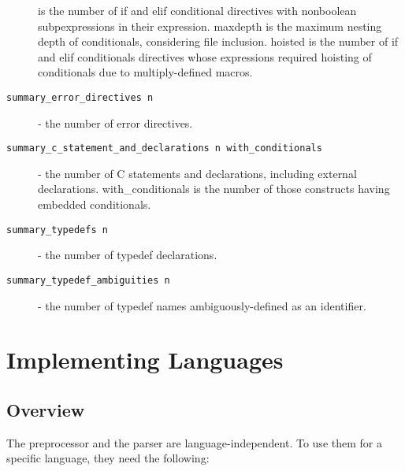 \documentclass{article}
\begin{document}
\begin{description}
  is the number of if and elif conditional directives with nonboolean
  subpexpressions in their expression.  maxdepth is the maximum
  nesting depth of conditionals, considering file inclusion.  hoisted
  is the number of if and elif conditionals directives whose
  expressions required hoisting of conditionals due to
  multiply-defined macros.
\item[\texttt{summary\_error\_directives n}] - the number of error
  directives.
\item[\texttt{summary\_c\_statement\_and\_declarations n
    with\_conditionals}] - the number of C statements and
  declarations, including external declarations.  with\_conditionals
  is the number of those constructs having embedded conditionals.
\item[\texttt{summary\_typedefs n}] - the number of typedef
  declarations.
\item[\texttt{summary\_typedef\_ambiguities n}] - the number of
  typedef names ambiguously-defined as an identifier.
\end{description}


\section{Implementing Languages}

\subsection{Overview}

The preprocessor and the parser are language-independent.  To use them
for a specific language, they need the following:
\end{document}

